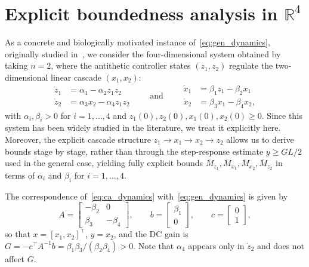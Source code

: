\documentclass{article}
\begin{document}
\section{Explicit boundedness analysis in $\mathbb{R}^4$}\label{sec:4d}

As a concrete and biologically motivated instance of~\eqref{eq:gen_dynamics}, 
originally studied in~\cite{AFC2016}, we consider the four-dimensional system 
obtained by taking $n=2$, where the antithetic controller states $(z_1, z_2)$ 
regulate the two-dimensional linear cascade $(x_1, x_2)$:
\begin{equation}\label{eq:ca_dynamics}
    \begin{aligned}
    \dot z_1 &= \alpha_1-\alpha_2 z_1 z_2\\
    \dot z_2 &= \alpha_3 x_2-\alpha_4 z_1 z_2
    \end{aligned}
    \qquad \textrm{and} \qquad
    \begin{aligned}
    \dot x_1 &= \beta_1 z_1-\beta_2 x_1\\
    \dot x_2 &= \beta_3 x_1-\beta_4 x_2,
    \end{aligned}
\end{equation}
with $\alpha_i,\beta_i>0$ for $i=1,\dots,4$ and $z_1(0),z_2(0),x_1(0),x_2(0)\ge 0$. Since this system 
has been widely studied in the literature, we treat it explicitly here. 
Moreover, the explicit cascade structure $z_1\to x_1\to x_2\to z_2$ allows 
us to derive bounds stage by stage, rather than through the step-response 
estimate $y\ge GL/2$ used in the general case, yielding fully 
explicit bounds $\overline{M}_{z_1}, \overline{M}_{x_1}, \overline{M}_{x_2}, \overline{M}_{z_2}$ 
in terms of $\alpha_i$ and $\beta_i$ for $i=1,\dots,4$.

The correspondence of~\eqref{eq:ca_dynamics} with~\eqref{eq:gen_dynamics} 
is given by
\begin{equation*}
    A = \begin{bmatrix} -\beta_2 & 0 \\ \beta_3 & -\beta_4 \end{bmatrix}, \qquad
    b = \begin{bmatrix} \beta_1 \\ 0 \end{bmatrix}, \qquad
    c = \begin{bmatrix} 0 \\ 1 \end{bmatrix},
\end{equation*}
so that $x=[x_1,x_2]^\top$, $y=x_2$, and the DC gain is
$G = -c^\top A^{-1}b = \beta_1\beta_3/(\beta_2\beta_4)>0$.
Note that $\alpha_4$ appears only in $\dot z_2$ and does not affect $G$.
\end{document}
